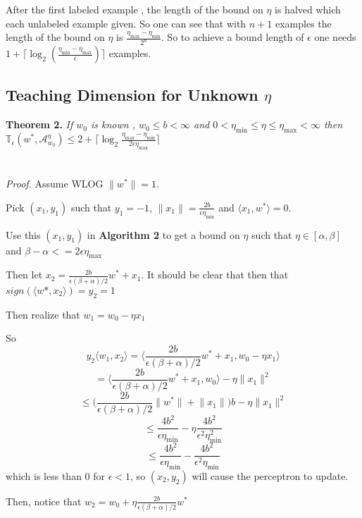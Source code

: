 \documentclass{article}
\newcommand{\learn}{\mathcal{A}_{w_0}^\eta}
\begin{document}
After the first labeled example , the length of the bound on $\eta$ is halved which each unlabeled example given. So one can see that with $n + 1$ examples the length of the bound on $\eta$ is $\frac{\eta_{\max} - \eta_{\min}}{2 ^ n }$. So to achieve a bound length of $\epsilon$ one needs
$ 1 + \lceil \log_2 ( \frac{\eta_
{\min} - \eta_{\max}}{\epsilon} ) \rceil$ examples.

\subsection{Teaching Dimension for Unknown $\eta$}

\textbf{Theorem 2.}
\textit{ If $w_0$ is known , $w_0 \leq b < \infty$ and $ 0 < \eta_{\min} \leq \eta \leq \eta_{\max} < \infty$ 
then $\mathbb{T}_{\epsilon}(w^*, \learn)  \leq 2 + \lceil \log_2 \frac{\eta_{\max} - \eta_{\min}}{2\epsilon\eta_{\max}}  \rceil$
}
\\
\\
\\
\textit{Proof.}
Assume WLOG $\lVert w^* \rVert = 1$.

Pick $(x_1,y_1)$ such that $y_1 = -1$, $\lVert x_1 \rVert = \frac{2 b}{\epsilon \eta_{\min}}$ and $\langle x_1 , w^* \rangle = 0$.

Use this $(x_1, y_1)$ in \textbf{Algorithm 2} to get a bound on $\eta$ such that $\eta \in [\alpha , \beta]$ and $\beta - \alpha <= 2\epsilon \eta_{\max}$

Then let $x_2 = \frac{2 b}{\epsilon (\beta + \alpha)/2}w^* + x_1$.
It should be clear that then that $sign(\langle w* , x_2 \rangle) =  y_2 = 1$

Then realize that
$w_1 = w_0 - \eta x_1$

So
$$
y_2 \langle w_1, x_2 \rangle  = \bigg\langle \frac{2 b}{\epsilon (\beta + \alpha) /2} w^* + x_1 , w_0 - \eta x_1 \bigg\rangle
$$
$$
= \bigg\langle \frac{2 b}{\epsilon (\beta + \alpha) /2} w^* + x_1 , w_0  \bigg\rangle - \eta \lVert x_1 \rVert^2
$$
$$
\leq \bigg( \frac{2 b}{\epsilon (\beta + \alpha) /2} \lVert w^* \rVert + \lVert x_1 \rVert \bigg ) b - \eta \lVert x_1 \rVert^2
$$
$$
\leq \frac{4 b ^2}{\epsilon \eta_{\min}} - \eta \frac{4 b^2}{\epsilon^2 \eta_{\min}^2}
$$
$$
\leq \frac{4 b^2}{\epsilon \eta_{\min}}  -  \frac{4 b^2}{\epsilon^2 \eta_{\min}}
$$
which is less than $0$ for $\epsilon < 1$, so $(x_2 , y_2)$ will cause the perceptron to update.

Then,
notice that $w_2 = w_0 +\eta \frac{2  b}{\epsilon (\beta + \alpha)/2} w^*$
\end{document}
